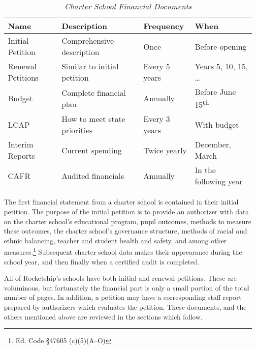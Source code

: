 \begin{table}[ht]
  \centering\small%
  \caption[Charter School Financial Documents]{\textit{Charter School Financial Documents}}\label{tab:charter-fin-docs}%
  \begin{tabular}{llll}
    \toprule%
    \textbf{Name}  & \textbf{Description} & \textbf{Frequency} & \textbf{When} \\
    \midrule%
    Initial Petition  & Comprehensive description    & Once           & Before opening \\
    Renewal Petitions & Similar to initial petition  & Every 5 years  & Years 5, 10, 15, \ldots \\
    Budget            & Complete financial plan      & Annually       & Before June 15\textsuperscript{th} \\
    LCAP              & How to meet state priorities & Every 3 years  & With budget\\
    Interim Reports   & Current spending             & Twice yearly   & December, March \\
    CAFR              & Audited financials           & Annually       & In the following year \\
    \bottomrule%
  \end{tabular}
\end{table}%
%
%
%
%
%

The first financial statement from a charter school is contained in their initial petition. The purpose of the initial petition is to provide an authorizer with data on the charter school's educational program, pupil outcomes, methods to measure these outcomes, the charter school's governance structure, methods of racial and ethnic balancing, teacher and student health and safety, and among other measures.\footnote{Ed. Code §47605 (c)(5)(A–O)} Subsequent charter school data makes their apprearance during the school year, and then finally when a certified audit is completed.

All of Rocketship's schools have both initial and renewal petitions. These are voluminous, but fortunately the financial part is only a small portion of the total number of pages. In addition, a petition may have a corresponding staff report prepared by authorizers which evaluates the petition. These documents, and the others mentioned above are reviewed in the sections which follow.

